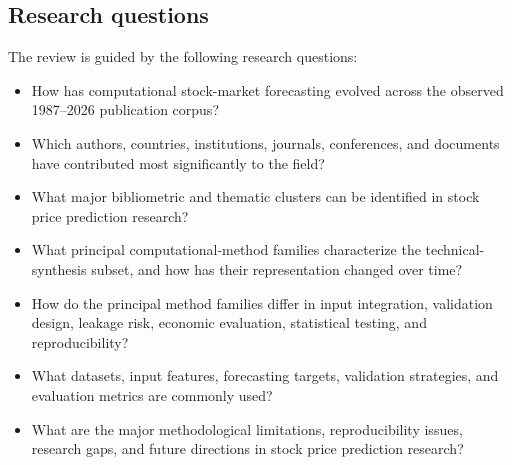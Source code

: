 \documentclass[pdflatex,sn-mathphys-num]{sn-jnl}%
\providecommand{\NTech}{485}
\theoremstyle{thmstyleone}%
\theoremstyle{thmstyletwo}%
\theoremstyle{thmstylethree}%
\begin{document}




\subsection{Research questions}

The review is guided by the following research questions:

\begin{itemize}
    \item[\textbf{RQ1.}] How has computational stock-market forecasting
evolved across the observed 1987--2026 publication corpus?
    \item[\textbf{RQ2.}] Which authors, countries, institutions, journals, conferences, and documents have contributed most significantly to the field?
    \item[\textbf{RQ3.}] What major bibliometric and thematic clusters can be identified in stock price prediction research?
    \item[\textbf{RQ4.}] What principal computational-method families characterize the technical-synthesis subset, and how has their representation changed over time?
    \item[\textbf{RQ5.}] How do the principal method families differ in input integration, validation design, leakage risk, economic evaluation, statistical testing, and reproducibility?
    \item[\textbf{RQ6.}] What datasets, input features, forecasting targets, validation strategies, and evaluation metrics are commonly used?
    \item[\textbf{RQ7.}] What are the major methodological limitations, reproducibility issues, research gaps, and future directions in stock price prediction research?
\end{itemize}
\end{document}
